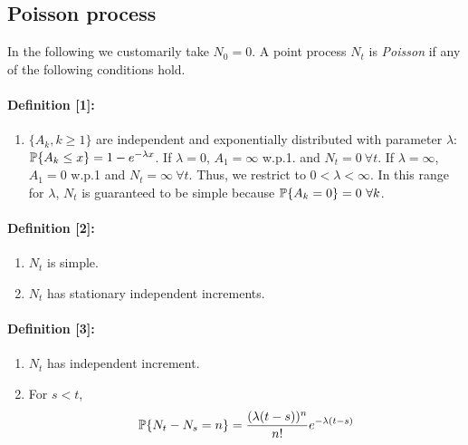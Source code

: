 \documentclass[all-lectures.tex]{subfiles}
\begin{document}
\subsection{Poisson process}
In the following we customarily take $N_0 = 0$. A point process $N_t$ is \textit{Poisson} if any of the following conditions hold.
\paragraph{Definition [1]:}{
\begin{enumerate}
\item $\{A_k, k \geq 1\}$ are independent and exponentially distributed with parameter $\lambda$: $\P\{A_k \leq x\} = 1 - e^{-\lambda x}$. If $\lambda = 0$, $A_1 = \infty$ w.p.1. and $N_t = 0 \ \forall t$. If $\lambda = \infty$, $A_1 = 0$ w.p.1 and $N_t = \infty \ \forall t$. Thus, we restrict to $0<\lambda<\infty$. In this range for $\lambda$, $N_t$ is guaranteed to be simple because $\P\{A_k = 0\} = 0 \ \forall k$.
\end{enumerate}
}
\paragraph{Definition [2]:}{
\begin{enumerate}
\item $N_t$ is simple.
\item $N_t$ has stationary independent increments.
\end{enumerate}
}
\paragraph{Definition [3]:}{
\begin{enumerate}
\item $N_t$ has independent increment.
\item For $s < t$, 
	\begin{align*}
	\P\{N_t - N_s = n\} = \frac{(\lambda (t-s))^n}{n!} e^{-\lambda (t-s)}
	\end{align*}
\end{enumerate}
}
\end{document}
